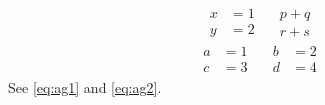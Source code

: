\documentclass{article}
\begin{document}
\begin{equation}\label{eq:ag1}
\begin{aligned}
x &= 1 \\ y &= 2
\end{aligned}
\quad
\begin{gathered}
p + q \\ r + s
\end{gathered}
\end{equation}
\begin{align}\label{eq:ag2}
\begin{alignedat}{2}
a &= 1 &\quad b &= 2 \\
c &= 3 &\quad d &= 4
\end{alignedat}
\end{align}
See \eqref{eq:ag1} and \eqref{eq:ag2}.
\end{document}
